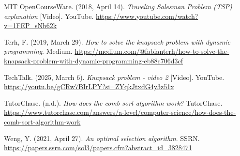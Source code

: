 \documentclass{article}
\begin{document}
\begin{thebibliography}{}
 MIT OpenCourseWare. (2018, April 14). \textit{Traveling Salesman Problem (TSP) explanation} [Video]. YouTube. \url{https://www.youtube.com/watch?v=1FEP_sNb62k}

 Terh, F. (2019, March 29). \textit{How to solve the knapsack problem with dynamic programming}. Medium. \url{https://medium.com/@fabianterh/how-to-solve-the-knapsack-problem-with-dynamic-programming-eb88c706d3cf}

 TechTalk. (2025, March 6). \textit{Knapsack problem - video 2} [Video]. YouTube. \url{https://youtu.be/gCRw7BIrLPY?si=ZYqkJtxdG4y3z51x}

 TutorChase. (n.d.). \textit{How does the comb sort algorithm work?} TutorChase. \url{https://www.tutorchase.com/answers/a-level/computer-science/how-does-the-comb-sort-algorithm-work}

 Weng, Y. (2021, April 27). \textit{An optimal selection algorithm}. SSRN. \url{https://papers.ssrn.com/sol3/papers.cfm?abstract_id=3828471}

\end{thebibliography}
\end{document}
